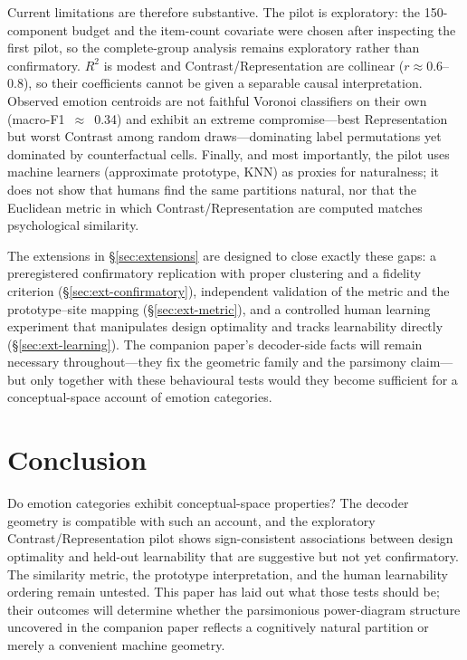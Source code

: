 \documentclass[11pt]{article}
\begin{document}
Current limitations are therefore substantive. The pilot is exploratory: the 150-component budget and the item-count covariate were chosen after inspecting the first pilot, so the complete-group analysis remains exploratory rather than confirmatory. $R^2$ is modest and Contrast/Representation are collinear ($r\approx0.6$--$0.8$), so their coefficients cannot be given a separable causal interpretation. Observed emotion centroids are not faithful Voronoi classifiers on their own (macro-F1~$\approx$~0.34) and exhibit an extreme compromise---best Representation but worst Contrast among random draws---dominating label permutations yet dominated by counterfactual cells. Finally, and most importantly, the pilot uses machine learners (approximate prototype, KNN) as proxies for naturalness; it does not show that humans find the same partitions natural, nor that the Euclidean metric in which Contrast/Representation are computed matches psychological similarity.

The extensions in \S\ref{sec:extensions} are designed to close exactly these gaps: a preregistered confirmatory replication with proper clustering and a fidelity criterion (\S\ref{sec:ext-confirmatory}), independent validation of the metric and the prototype--site mapping (\S\ref{sec:ext-metric}), and a controlled human learning experiment that manipulates design optimality and tracks learnability directly (\S\ref{sec:ext-learning}). The companion paper's decoder-side facts will remain necessary throughout---they fix the geometric family and the parsimony claim---but only together with these behavioural tests would they become sufficient for a conceptual-space account of emotion categories.

\section{Conclusion}
\label{sec:conclusion}

Do emotion categories exhibit conceptual-space properties? The decoder geometry is compatible with such an account, and the exploratory Contrast/Representation pilot shows sign-consistent associations between design optimality and held-out learnability that are suggestive but not yet confirmatory. The similarity metric, the prototype interpretation, and the human learnability ordering remain untested. This paper has laid out what those tests should be; their outcomes will determine whether the parsimonious power-diagram structure uncovered in the companion paper reflects a cognitively natural partition or merely a convenient machine geometry.
\end{document}
